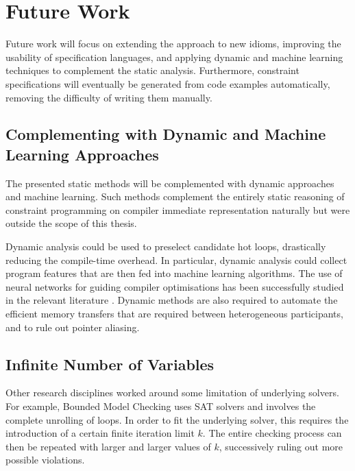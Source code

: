 \section{Future Work}

    Future work will focus on extending the approach to new idioms,
    improving the usability of specification languages, and
    applying dynamic and machine learning techniques to complement the static
    analysis.
    Furthermore, constraint specifications will eventually be generated from
    code examples automatically, removing the difficulty of writing them
    manually.

\subsection*{Complementing with Dynamic and Machine Learning Approaches}

    The presented static methods will be complemented with dynamic approaches
    and machine learning.
    Such methods complement the entirely static reasoning of constraint
    programming on compiler immediate representation naturally but were
    outside the scope of this thesis.

    Dynamic analysis could be used to preselect candidate hot loops, drastically
    reducing the compile-time overhead.
    In particular, dynamic analysis could collect program features that are
    then fed into machine learning algorithms.
    The use of neural networks for guiding compiler optimisations has been
    successfully studied in the relevant literature
    \citep{DBLP:journals/pieee/WangO18}.
    Dynamic methods are also required to automate the efficient memory transfers
    that are required between heterogeneous participants, and to rule out
    pointer aliasing.

\subsection*{Infinite Number of Variables}

    Other research disciplines worked around some limitation of underlying
    solvers.
    For example, Bounded Model Checking \cite{Clarke:2001:BMC:510986.510987}
    uses SAT solvers and involves the complete unrolling of loops.
    In order to fit the underlying solver, this requires the introduction of a
    certain finite iteration limit $k$.
    The entire checking process can then be repeated with larger and larger
    values of $k$, successively ruling out more possible violations.

